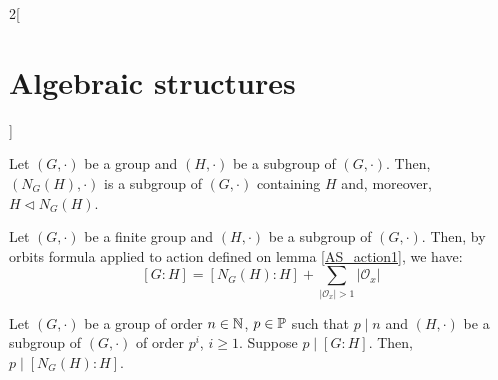 \documentclass[../../../main.tex]{subfiles}
\begin{document}
\begin{multicols}{2}[\section{Algebraic structures}]
\begin{definition}
\end{definition}
\begin{lemma}
    Let $(G,\cdot)$ be a group and $(H,\cdot)$ be a subgroup of $(G,\cdot)$. Then, $(N_G(H),\cdot)$ is a subgroup of $(G,\cdot)$ containing $H$ and, moreover, $H\lhd N_G(H)$.
\end{lemma}
\begin{corollary}
    Let $(G,\cdot)$ be a finite group and $(H,\cdot)$ be a subgroup of $(G,\cdot)$. Then, by orbits formula applied to action defined on lemma \ref{AS_action1}, we have: $$[G:H]=[N_G(H):H]+\sum_{|\mathcal{O}_x|>1}|\mathcal{O}_x|$$
\end{corollary}
\begin{prop}
    Let $(G,\cdot)$ be a group of order $n\in\mathbb{N} $, $p\in\mathbb{P}$ such that $p\mid n$ and $(H,\cdot)$ be a subgroup of $(G,\cdot)$ of order $p^i$, $i\geq 1$. Suppose $p\mid[G:H]$. Then, $p\mid[N_G(H):H]$.
\end{prop}

\end{multicols}
\end{document}
